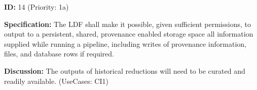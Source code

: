 \documentclass[SE,toc,lsstdraft]{lsstdoc}
\newcommand{\addendum}{}
\begin{document}
\label{14}
\textbf{ID:} 14 (Priority: 1a)

\textbf{Specification:}
The LDF shall make it possible, given sufficient permissions, to output to a persistent, shared, provenance enabled storage space all information supplied while running a pipeline, including writes of provenance information, files, and database rows if required.

\textbf{Discussion:}
The outputs of historical reductions will need to be curated and readily available. (UseCases: CI1)

\addendum


\end{document}
